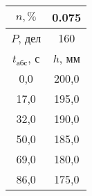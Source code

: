 \begin{tabular}[t]{|c|c|}
\hline
$n, \%$ & 0.075 \\
\hline
$P$, дел & 160 \\
\hline
$t_{абс}$, с & $h$, мм \\ 
\hline
0,0 & 200,0 \\ 
17,0 & 195,0 \\ 
32,0 & 190,0 \\ 
50,0 & 185,0 \\ 
69,0 & 180,0 \\ 
86,0 & 175,0 \\ 
\hline
\end{tabular}